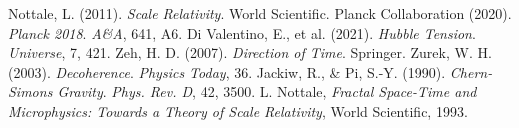 \documentclass[aps,prl,twocolumn,groupedaddress]{revtex4-2}
\begin{document}
\begin{thebibliography}{9}
 Nottale, L. (2011). \textit{Scale Relativity}. World Scientific.
 Planck Collaboration (2020). \textit{Planck 2018}. \textit{A\&A}, 641, A6.
 Di Valentino, E., et al. (2021). \textit{Hubble Tension}. \textit{Universe}, 7, 421.
 Zeh, H. D. (2007). \textit{Direction of Time}. Springer.
 Zurek, W. H. (2003). \textit{Decoherence}. \textit{Physics Today}, 36.
 Jackiw, R., & Pi, S.-Y. (1990). \textit{Chern-Simons Gravity}. \textit{Phys. Rev. D}, 42, 3500.
 L. Nottale, \textit{Fractal Space-Time and Microphysics: Towards a Theory of Scale Relativity}, World Scientific, 1993.
\end{thebibliography}
\end{document}
